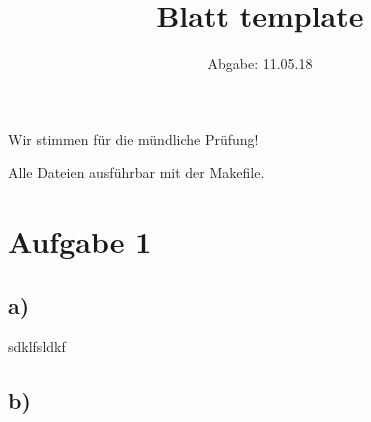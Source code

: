 

\usepackage{listings}
\usepackage[dvipsnames]{xcolor}

\title{Blatt template}
\date{
  Abgabe: 11.05.18
}


\maketitle
Wir stimmen für die mündliche Prüfung!

Alle Dateien ausführbar mit der Makefile. %
\section*{Aufgabe 1}
\subsection*{a)}
sdklfsldkf
\subsection*{b)}







